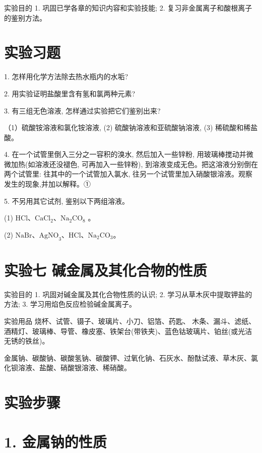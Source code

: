 \documentclass[10pt]{article}
\newcommand{\customfootnote}[1]{
  \let\thefootnote\relax\footnotetext{#1}
}
\begin{document}
实验目的 1. 巩固已学各章的知识内容和实验技能; 2. 复习非金属离子和酸根离子的鉴别方法。

\section*{实验习题}

1. 怎样用化学方法除去热水瓶内的水垢?

2. 用实验证明盐酸里含有氢和氯两种元素?

3. 有三组无色溶液, 怎样通过实验把它们鉴别出来?

（1）硫酸铵溶液和氯化铵溶液, (2) 硫酸钠溶液和亚硫酸钠溶液, (3) 稀硫酸和稀盐酸。

4. 在一个试管里倒入三分之一容积的溴水, 然后加入一些锌粉, 用玻璃棒搅动并微微加热(如溶液还没褪色, 可再加入一些锌粉), 到溶液变成无色。把这溶液分别倒在两个试管里: 往其中的一个试管加入氯水, 往另一个试管里加入硝酸银溶液。观察发生的现象,并加以解释。①

5. 不另用其它试剂, 鉴别以下两组溶液。

(1) \(\mathrm{{HCl}}\text{、}{\mathrm{{CaCl}}}_{2}\text{、}{\mathrm{{Na}}}_{2}{\mathrm{{CO}}}_{8}\) 。

(2) \(\mathrm{{NaBr}}\text{、}{\mathrm{{AgNO}}}_{3}\text{、}\mathrm{{HCl}}\text{、}{\mathrm{{Na}}}_{2}{\mathrm{{CO}}}_{3}。\)

\customfootnote{

①② 可根据情况选做。

}

\section*{实验七 碱金属及其化合物的性质}

实验目的 1. 巩固对碱金属及其化合物性质的认识; 2. 学习从草木灰中提取钾盐的方法; 3. 学习用焰色反应检验碱金属离子。

实验用品 烧杯、试管、镊子、玻璃片、小刀、铝箔、药匙、 木条、漏斗、滤纸、酒精灯、玻璃棒、导管、橡皮塞、铁架台(带铁夹)、蓝色钴玻璃片、铂丝(或光洁无锈的铁丝)。

金属钠、碳酸钠、碳酸氢钠、碳酸钾、过氧化钠、石灰水、酚酞试液、草木灰、氯化钡溶液、盐酸、硝酸银溶液、稀硝酸。

\section*{实验步骤}

\section*{1. 金属钠的性质}
\end{document}
